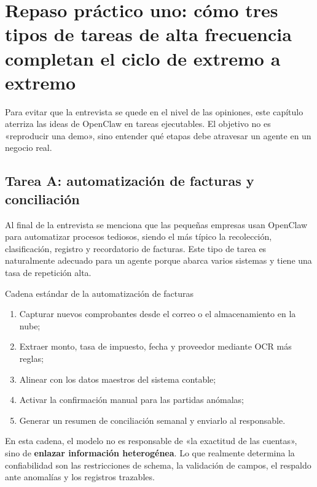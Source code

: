 \section{Repaso práctico uno: cómo tres tipos de tareas de alta frecuencia completan el ciclo de extremo a extremo}

Para evitar que la entrevista se quede en el nivel de las opiniones, este capítulo aterriza las ideas de OpenClaw en tareas ejecutables. El objetivo no es «reproducir una demo», sino entender qué etapas debe atravesar un agente en un negocio real.

\subsection{Tarea A: automatización de facturas y conciliación}

Al final de la entrevista se menciona que las pequeñas empresas usan OpenClaw para automatizar procesos tediosos, siendo el más típico la recolección, clasificación, registro y recordatorio de facturas. Este tipo de tarea es naturalmente adecuado para un agente porque abarca varios sistemas y tiene una tasa de repetición alta.

\begin{knowledgebox}{Cadena estándar de la automatización de facturas}
\begin{enumerate}
    \item Capturar nuevos comprobantes desde el correo o el almacenamiento en la nube;
    \item Extraer monto, tasa de impuesto, fecha y proveedor mediante OCR más reglas;
    \item Alinear con los datos maestros del sistema contable;
    \item Activar la confirmación manual para las partidas anómalas;
    \item Generar un resumen de conciliación semanal y enviarlo al responsable.
\end{enumerate}
\end{knowledgebox}

En esta cadena, el modelo no es responsable de «la exactitud de las cuentas», sino de \textbf{enlazar información heterogénea}. Lo que realmente determina la confiabilidad son las restricciones de schema, la validación de campos, el respaldo ante anomalías y los registros trazables.

